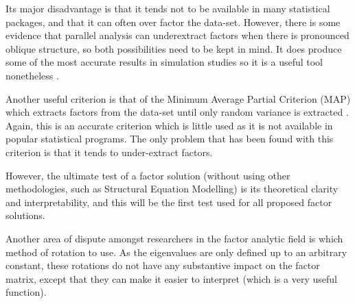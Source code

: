 Its major disadvantage is that it tends not to be available in many statistical packages, and that it can often over factor the data-set. However, there is some evidence \cite{beauducel2001problems} that parallel analysis can underextract factors when there is pronounced oblique structure, so both possibilities need to be kept in mind. It does produce some of the most accurate results in simulation studies so it is a useful tool nonetheless \cite{zwick1986comparison}.

Another useful criterion is that of the Minimum Average Partial Criterion (MAP) which extracts factors from the data-set until only random variance is extracted \cite{revelle1979very}. Again, this is an accurate criterion  \cite{zwick1986comparison} which is little used as it is not available in popular statistical programs. The only problem that  has been found with this criterion is that it tends to under-extract factors. %

However, the ultimate test of a factor solution (without using other methodologies, such as Structural Equation Modelling) \cite{joreskog1978structural} is its theoretical clarity and interpretability, and this will be the first test used for all proposed factor solutions.

Another area of dispute amongst researchers in the factor analytic field is which method of rotation to use\cite{sass2010comparative}. As the eigenvalues are only defined up to an arbitrary constant, these rotations do not have any substantive impact on the factor matrix, except that they can make it easier to interpret (which is a very useful function). 

